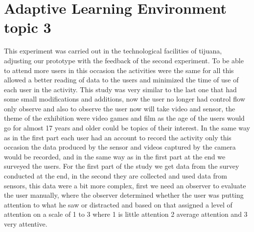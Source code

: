 \section{Adaptive Learning Environment topic 3}
This experiment was carried out in the technological facilities of tijuana, adjusting our prototype with the feedback of the second experiment. To be able to attend more users in this occasion the activities were the same for all this allowed a better reading of data to the users and minimized the time of use of each user in the activity.
This study was very similar to the last one that had some small modiﬁcations and additions, now the user no longer had control ﬂow only observe and also to observe the user now will take video and sensor, the theme of the exhibition were video games and ﬁlm as the age of the users would go for almost 17 years and older could be topics of their interest. In the same way as in the ﬁrst part each user had an account to record the activity only this occasion the data produced by the sensor and videos captured by the camera would be recorded, and in the same way as in the ﬁrst part at the end we surveyed the users.
For the ﬁrst part of the study we get data from the survey conducted at the end, in the second they are collected and used data from sensors, this data were a bit more complex, ﬁrst we need an observer to evaluate the user manually, where the observer determined whether the user was putting attention to what he saw or distracted and based on that assigned a level of attention on a scale of 1 to 3 where 1 is little attention 2 average attention and 3 very attentive. 
